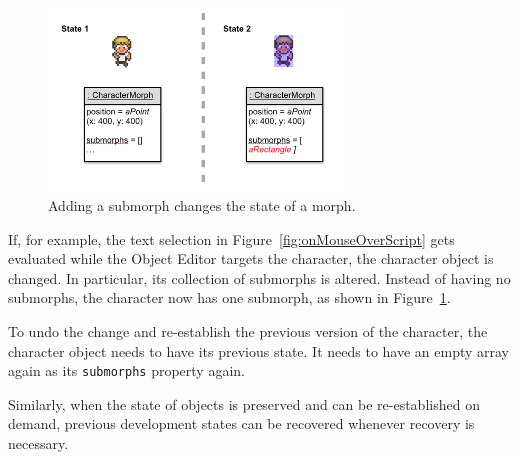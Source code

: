 \begin{figure}[h]
    \centering
    \includegraphics[width=0.7\textwidth]{figures/3_motivation/5_stateChanges.png}
    \caption{Adding a submorph changes the state of a morph.}
    \label{fig:changedCharacter}
\end{figure}

If, for example, the text selection in Figure~\ref{fig:onMouseOverScript} gets evaluated while the Object Editor targets the character, the character object is changed.
In particular, its collection of submorphs is altered.
Instead of having no submorphs, the character now has one submorph, as shown in Figure~\ref{fig:changedCharacter}.

To undo the change and re-establish the previous version of the character, the character object needs to have its previous state.
It needs to have an empty array again as its \lstinline{submorphs} property again.

Similarly, when the state of objects is preserved and can be re-established on demand, previous development states can be recovered whenever recovery is necessary.